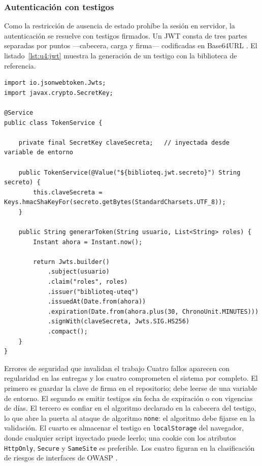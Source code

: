 \documentclass[11pt,a4paper,openany]{book}
\begin{document}
\subsubsection{Autenticación con testigos}

Como la restricción de ausencia de estado prohíbe la sesión en servidor, la autenticación se resuelve con testigos firmados. Un JWT consta de tres partes separadas por puntos ---cabecera, carga y firma--- codificadas en Base64URL \cite{jones2015jwt}. El listado~\ref{lst:u4:jwt} muestra la generación de un testigo con la biblioteca de referencia.

\begin{lstlisting}[style=java,caption={Generacion de un testigo firmado con vigencia limitada.},label={lst:u4:jwt}]
import io.jsonwebtoken.Jwts;
import javax.crypto.SecretKey;

@Service
public class TokenService {

	private final SecretKey claveSecreta;   // inyectada desde variable de entorno

	public TokenService(@Value("${biblioteq.jwt.secreto}") String secreto) {
		this.claveSecreta = Keys.hmacShaKeyFor(secreto.getBytes(StandardCharsets.UTF_8));
	}

	public String generarToken(String usuario, List<String> roles) {
		Instant ahora = Instant.now();

		return Jwts.builder()
			.subject(usuario)
			.claim("roles", roles)
			.issuer("biblioteq-uteq")
			.issuedAt(Date.from(ahora))
			.expiration(Date.from(ahora.plus(30, ChronoUnit.MINUTES)))
			.signWith(claveSecreta, Jwts.SIG.HS256)
			.compact();
	}
}
\end{lstlisting}

\begin{cajaadvertencia}{Errores de seguridad que invalidan el trabajo}
	Cuatro fallos aparecen con regularidad en las entregas y los cuatro comprometen el sistema por completo. El primero es guardar la clave de firma en el repositorio; debe leerse de una variable de entorno. El segundo es emitir testigos sin fecha de expiración o con vigencias de días. El tercero es confiar en el algoritmo declarado en la cabecera del testigo, lo que abre la puerta al ataque de algoritmo \texttt{none}: el algoritmo debe fijarse en la validación. El cuarto es almacenar el testigo en \texttt{localStorage} del navegador, donde cualquier script inyectado puede leerlo; una cookie con los atributos \texttt{HttpOnly}, \texttt{Secure} y \texttt{SameSite} es preferible. Los cuatro figuran en la clasificación de riesgos de interfaces de OWASP \cite{owasp2023api}.
\end{cajaadvertencia}
\end{document}
